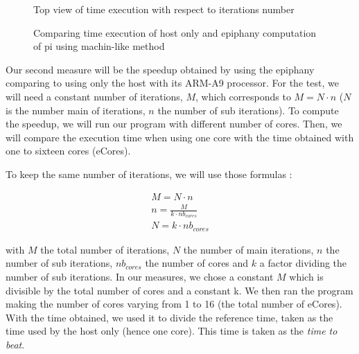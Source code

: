 \begin{figure}
  \begin{subfigure}{.5\textwidth}
  \centering
  \noindent{}
  \end{subfigure}
  \begin{subfigure}{.5\textwidth}
  \centering
  \noindent{}
  \end{subfigure}
\caption{Top view of time execution with respect to iterations number}
\label{fig measures pi3}
\end{figure}

\begin{figure}[h!]
\centering
\noindent{}
\caption{Comparing time execution of host only and \gls{epiphany} computation of pi using machin-like method}
\label{fig measures pi2}
\end{figure}

Our second measure will be the speedup obtained by using the \gls{epiphany} comparing to using only the host with its ARM-A9 processor. For the test, we will need a constant number of iterations, $M$, which corresponds to $M = N \cdot n$ ($N$ is the number main of iterations, $n$ the number of sub iterations). To compute the speedup, we will run our program with different number of cores. Then, we will compare the execution time when using one core with the time obtained with one to sixteen cores (\glspl{eCore}).

To keep the same number of iterations, we will use those formulas :

\begin{align*}
	M = N \cdot n \\
	n = \frac{M}{k \cdot nb_{cores}}\\
	N = k \cdot nb_{cores}
\end{align*}

with $M$ the total number of iterations, $N$ the number of main iterations, $n$ the number of sub iterations, $nb_{cores}$ the number of cores and $k$ a factor dividing the number of sub iterations. In our measures, we chose a constant $M$ which is divisible by the total number of cores and a constant k. We then ran the program making the number of cores varying from 1 to 16 (the total number of \glspl{eCore}). With the time obtained, we used it to divide the reference time, taken as the time used by the host only (hence one core). This time is taken as the \textit{time to beat}.

